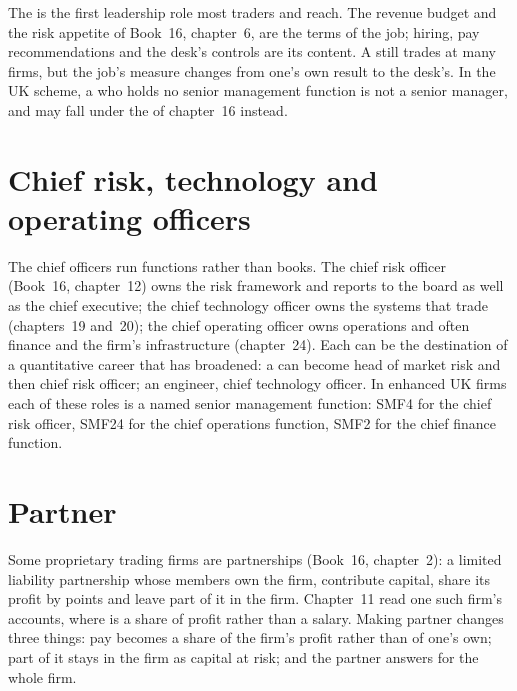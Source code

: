 The  is the first leadership role most traders and  reach. The revenue budget and the
risk appetite of Book~16, chapter~6, are the terms of the job; hiring, pay recommendations and the desk's controls are
its content. A  still trades at many firms, but the job's measure changes from one's own result to the
desk's. In the UK scheme, a  who holds no senior management function is not a senior manager, and may fall
under the  of chapter~16 instead.

\section{Chief risk, technology and operating officers}

The chief officers run functions rather than books. The chief risk officer (Book~16, chapter~12) owns the risk
framework and reports to the board as well as the chief executive; the chief technology officer owns the systems that
trade (chapters~19 and~20); the chief operating officer owns operations and often finance and the firm's infrastructure
(chapter~24). Each can be the destination of a quantitative career that has broadened: a  can become head of
market risk and then chief risk officer; an engineer, chief technology officer. In enhanced UK firms each of
these roles is a named senior management function: SMF4 for the chief risk officer, SMF24 for the chief operations
function, SMF2 for the chief finance function.

\section{Partner}

Some proprietary trading firms are partnerships (Book~16, chapter~2): a limited liability partnership whose members own
the firm, contribute capital, share its profit by points and leave part of it in the firm. Chapter~11 read one such
firm's accounts, where  is a share of profit rather than a salary. Making partner changes three
things: pay becomes a share of the firm's profit rather than of one's own; part of it stays in the firm as capital at
risk; and the partner answers for the whole firm.

